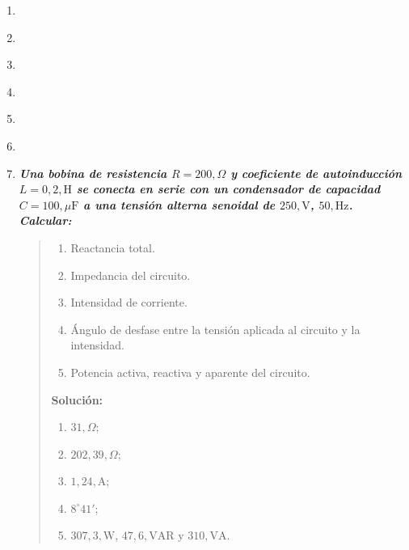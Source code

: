 \documentclass[spanish,openany]{report}
\begin{document}
\begin{enumerate}
		
	\item
		\begin{quote}
		\end{quote}
		
\clearpage
	\item
		\begin{quote}
		\end{quote}
		
	\item
		\begin{quote}
		\end{quote}
		
	\item
		\begin{quote}
		\end{quote}
		
	\item
		\begin{quote}
		\end{quote}
		
	\item
		\begin{quote}
		\end{quote}
		
	\item\textbf{\textit{{Una bobina de resistencia $R = 200 , \Omega$ y coeficiente de autoinducción $L = 0,2 , \mathrm{H}$ se conecta en serie con un condensador de capacidad $C = 100 , \mu\mathrm{F}$ a una tensión alterna senoidal de $250 , \mathrm{V}$, $50 , \mathrm{Hz}$. Calcular:}}}
		\begin{quote}
		\begin{enumerate}[label=\alph*)]
				\item Reactancia total.
				\item Impedancia del circuito.
				\item Intensidad de corriente.
				\item Ángulo de desfase entre la tensión aplicada al circuito y la intensidad.
				\item Potencia activa, reactiva y aparente del circuito.
			\end{enumerate}
			\textbf{Solución:}
			\begin{enumerate}[label=\alph*)]
				\item $31 , \Omega$;
				\item $202,39 , \Omega$;
				\item $1,24 , \mathrm{A}$;
				\item $8^\circ 41'$;
				\item $307,3 , \mathrm{W}$, $47,6 , \mathrm{VAR}$ y $310 , \mathrm{VA}$.
			\end{enumerate}


\end{quote}
\end{enumerate}
\end{document}
